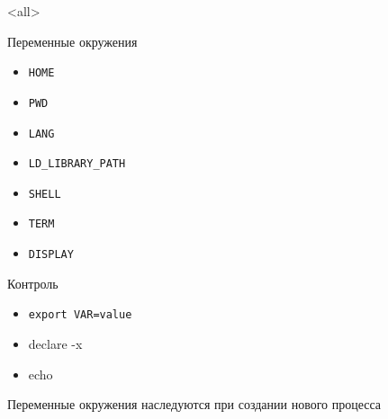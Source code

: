 
\mode<all>{}
\begin{frame}{Переменные окружения}
  \begin{itemize}
    \item {\tt HOME}
    \item {\tt PWD}
    \item {\tt LANG}
    \item {\tt LD\_LIBRARY\_PATH}
    \item {\tt SHELL}
    \item {\tt TERM}
    \item {\tt DISPLAY}
  \end{itemize}

  Контроль

  \begin{itemize}
    \item {\tt export VAR=value}
    \item declare -x
    \item echo 
  \end{itemize}

  Переменные окружения наследуются при создании нового процесса
\end{frame}



